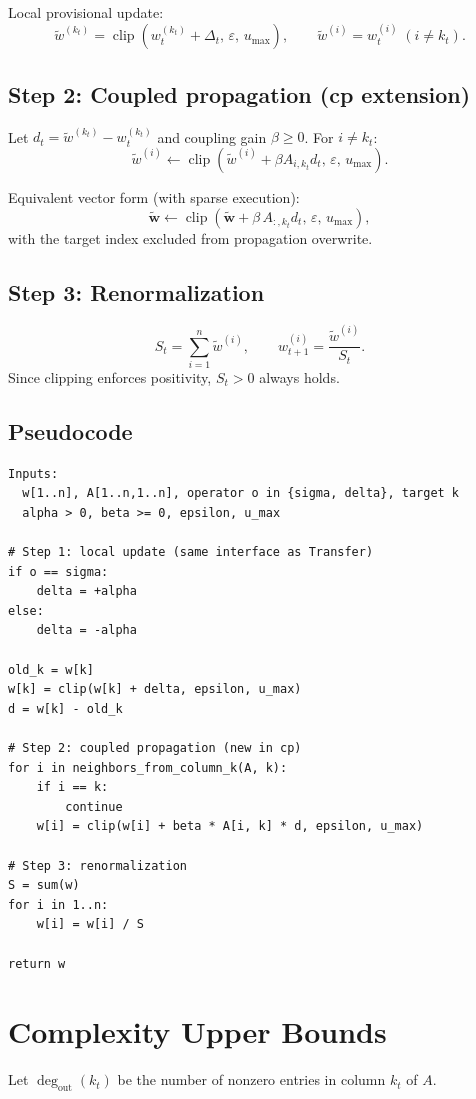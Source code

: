 \documentclass[11pt,a4paper]{article}
\begin{document}
Local provisional update:
\[
\tilde{w}^{(k_t)} = \operatorname{clip}\left(w_t^{(k_t)}+\Delta_t,\,\varepsilon,\,u_{\max}\right),\qquad
\tilde{w}^{(i)} = w_t^{(i)}\;(i\neq k_t).
\]

\subsection{Step 2: Coupled propagation (cp extension)}
Let \(d_t=\tilde{w}^{(k_t)}-w_t^{(k_t)}\) and coupling gain \(\beta\ge 0\). For \(i\neq k_t\):
\[
\tilde{w}^{(i)} \leftarrow \operatorname{clip}\left(\tilde{w}^{(i)} + \beta A_{i,k_t} d_t,\,\varepsilon,\,u_{\max}\right).
\]

Equivalent vector form (with sparse execution):
\[
\tilde{\mathbf{w}} \leftarrow \operatorname{clip}\left(\tilde{\mathbf{w}} + \beta\,A_{:,k_t}d_t,\,\varepsilon,\,u_{\max}\right),
\]
with the target index excluded from propagation overwrite.

\subsection{Step 3: Renormalization}
\[
S_t = \sum_{i=1}^{n}\tilde{w}^{(i)},\qquad
w_{t+1}^{(i)} = \frac{\tilde{w}^{(i)}}{S_t}.
\]
Since clipping enforces positivity, \(S_t>0\) always holds.

\subsection{Pseudocode}
\begin{lstlisting}[caption={cp single-turn client update (fixed LLM interface)}]
Inputs:
  w[1..n], A[1..n,1..n], operator o in {sigma, delta}, target k
  alpha > 0, beta >= 0, epsilon, u_max

# Step 1: local update (same interface as Transfer)
if o == sigma:
    delta = +alpha
else:
    delta = -alpha

old_k = w[k]
w[k] = clip(w[k] + delta, epsilon, u_max)
d = w[k] - old_k

# Step 2: coupled propagation (new in cp)
for i in neighbors_from_column_k(A, k):
    if i == k:
        continue
    w[i] = clip(w[i] + beta * A[i, k] * d, epsilon, u_max)

# Step 3: renormalization
S = sum(w)
for i in 1..n:
    w[i] = w[i] / S

return w
\end{lstlisting}

\section{Complexity Upper Bounds}
Let \(\deg_{\text{out}}(k_t)\) be the number of nonzero entries in column \(k_t\) of \(A\).
\end{document}
